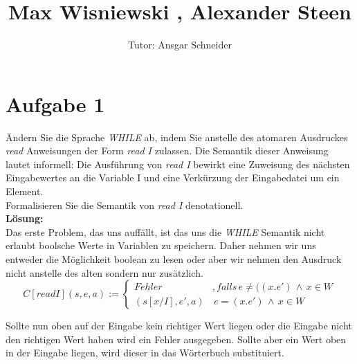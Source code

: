 \documentclass[11pt,a4paper,ngerman]{article}
\author{Tutor: Ansgar Schneider}
\date{}
\title{Max Wisniewski , Alexander Steen}
\begin{document}

\maketitle
\thispagestyle{fancy}



\section*{Aufgabe 1}

Ändern Sie die Sprache \emph{WHILE} ab, indem Sie anstelle des atomaren Ausdruckes \emph{read} Anweisungen
der Form \emph{read I} zulassen. Die Semantik dieser Anweisung lautet informell: Die Ausführung von \emph{read I} bewirkt eine Zuweisung des nächsten Eingabewertes an die Variable I und eine Verkürzung der Eingabedatei um ein Element.\\

Formalisieren Sie die Semantik von \emph{read I} denotationell.\\

\textbf{Lösung:}\\
Das erste Problem, das uns auffällt, ist das uns die \emph{WHILE} Semantik nicht erlaubt boolsche
Werte in Variablen zu speichern. Daher nehmen wir uns entweder die Möglichkeit boolean zu lesen
oder aber wir nehmen den Ausdruck nicht anstelle des alten sondern nur zusätzlich.\\

$$
C[read I](s,e,a) := \left\{
\begin{array}{lr}
\underline{Fehler} \;\;&,falls \, e\not= ((x.e')\, \land \, x \in W\\
(s[x/I],e',a) &\, e=(x.e') \, \land \, x \in W
\end{array}
\right.
$$

Sollte nun oben auf der Eingabe kein richtiger Wert liegen oder die Eingabe nicht den richtigen Wert haben
wird ein Fehler ausgegeben. Sollte aber ein Wert oben in der Eingabe liegen, wird dieser in das Wörterbuch
substituiert.

\end{document}
